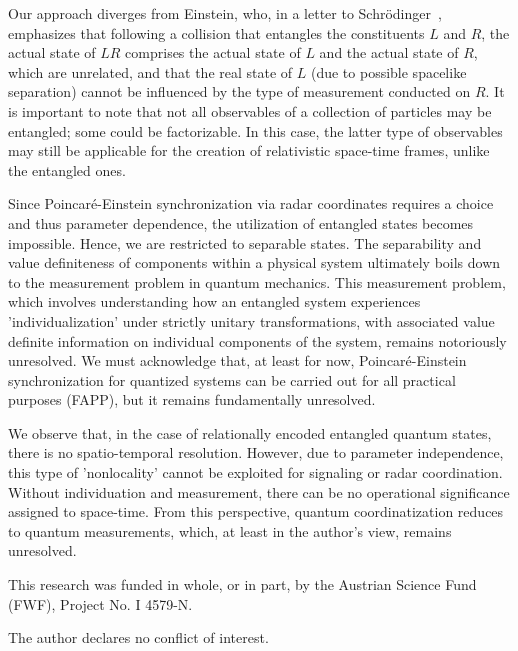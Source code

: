 \documentclass[%
  reprint,
 showpacs,
 showkeys,
 preprintnumbers,
 nofootinbib,
 amsmath,amssymb,
 aps,
 pra,
  longbibliography,
 ]{revtex4-2}
\begin{document}
Our approach diverges from Einstein, who, in a letter to Schr\"odinger~\cite{Meyenn-2011,Howard1985171}, emphasizes that
following a collision that entangles the constituents $L$ and $R$, the actual state of $LR$
comprises the actual state of $L$ and the actual state of $R$, which are unrelated,
and that the real state of $L$ (due to possible spacelike separation)
cannot be influenced by the type of measurement conducted on $R$.
It is important to note that not all observables of a collection of particles may be entangled; some could be factorizable. In this case, the latter type of observables may still be applicable for
the creation of relativistic space-time frames, unlike the entangled ones.

Since Poincar\'e-Einstein synchronization via radar coordinates requires a choice and thus parameter dependence, the utilization of entangled states becomes impossible.
Hence, we are restricted to separable states. The separability and value definiteness of components within a physical system ultimately boils down to the measurement problem in quantum mechanics.
This measurement problem, which involves understanding how an entangled system experiences 'individualization' under strictly unitary transformations, with associated value definite information on individual components of the system, remains notoriously unresolved.
We must acknowledge that, at least for now,
Poincar\'e-Einstein synchronization for quantized systems can be carried out for all practical purposes (FAPP),
but it remains fundamentally unresolved.

We observe that, in the case of relationally encoded entangled quantum states, there is no spatio-temporal resolution. However, due to parameter independence, this type of 'nonlocality' cannot be exploited for signaling or radar coordination.
Without individuation and measurement, there can be no operational significance assigned to space-time.
From this perspective, quantum coordinatization reduces to quantum measurements, which,
at least in the author's view, remains unresolved.


\begin{acknowledgments}
This research was funded in whole, or in part, by the Austrian Science Fund (FWF), Project No. I 4579-N.

The author declares no conflict of interest.
\end{acknowledgments}



\end{document}
